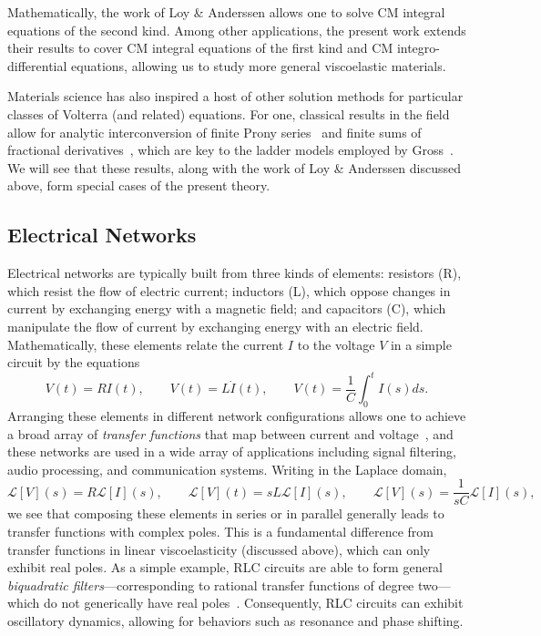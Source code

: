 \documentclass{cams-l} %
\newcommand{\dave}[1]{#1}\newcommand{\davebegin}{}\newcommand{\daveend}{}\newcommand{\george}[1]{#1}
\newcommand{\cL}{\mathcal L}
\theoremstyle{definition}
\theoremstyle{remark}
\numberwithin{equation}{section}
\begin{document}
\dave{Mathematically, the work of Loy \& Anderssen allows one to solve CM integral equations of the second kind. Among other applications, the present work extends their results to cover CM integral equations of the first kind and CM integro-differential equations, allowing us to study more general viscoelastic materials.}

Materials science has also inspired a host of other solution methods for particular classes of Volterra (and related) equations. For one, classical results in the field allow for analytic interconversion of finite Prony series~\cite{tschoegl2012phenomenological,bhattacharya2023learning} and finite sums of fractional derivatives~\cite{mainardi2022fractional}, which are key to the ladder models employed by Gross~\cite{gross1956ladder,gross1956ladder2}. We will see that these results, along with the work of Loy \& Anderssen discussed above, form special cases of \dave{the present theory}.

\subsection{Electrical Networks}
Electrical networks are typically built from \dave{three kinds of elements:} resistors (R), which resist the flow of electric current; inductors (L), which oppose changes in current by exchanging energy with a magnetic field; and capacitors (C), which manipulate the flow of current by exchanging energy with an electric field. Mathematically, these elements relate the current $I$ to the voltage $V$ in a \dave{simple circuit} by the equations
\begin{equation}
    V(t) = RI(t), \qquad V(t) = L\dot{I}(t), \qquad V(t) = \frac{1}{C}\int_0^t I(s)ds.
\end{equation}
Arranging these elements in different network configurations allows \dave{one} to achieve a broad array of \emph{transfer functions} that map between current and voltage~\cite{darlington1984history}, and these networks are used in a wide array of applications including signal filtering, audio processing, and communication systems. Writing in the Laplace domain,
\begin{equation}
    \cL[V](s) = R\cL[I](s), \qquad \cL[V](t) = sL\cL[I](s), \qquad \cL[V](s) = \frac{1}{sC}\cL[I](s),
\end{equation}
we see that composing these elements in series or in parallel generally leads to transfer functions with complex poles. This is a fundamental difference from transfer functions in linear viscoelasticity (discussed above), which can only exhibit real poles. As a simple example, RLC circuits are able to form \dave{general \emph{biquadratic filters}---corresponding to rational transfer functions of degree two---which do not generically have real poles~\cite{morelli2019passive}. Consequently, RLC circuits can exhibit oscillatory dynamics, allowing for behaviors such as resonance and phase shifting.}
\end{document}
